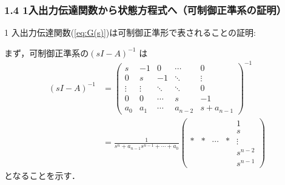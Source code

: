 \documentclass[10pt]{beamer}
\begin{document}
\begin{frame}[t]
\frametitle{1.4 1入出力伝達関数から状態方程式へ{\small （可制御正準系の証明）}}
1 入出力伝達関数(\ref{eq:G(s)})は可制御正準形で表されることの証明:

まず，可制御正準系の$(sI-A)^{-1}$ は
\begin{align}
 (sI-A)^{-1}
 &=
    \left(\begin{array}{ccccc}
     s      & -1     &  0     & \cdots &  0 \\
	 0      &  s     & -1     & \ddots &  \vdots \\
	 \vdots & \vdots & \ddots & \ddots &  0 \\
	 0      &  0     & \cdots & s      & -1 \\
	 a_0    &  a_1   & \cdots & a_{n-2}  &  s+a_{n-1}
	\end{array}\right)^{-1}
\nonumber\\
 &=
    \frac{1}{s^n + a_{n-1} s^{n-1}  + \cdots + a_0}
    \left(\begin{array}{ccccc}
        &    &        &    &  1 \\
	    &    &        &    &  s \\
	  * &  * & \cdots &  * &  \vdots \\
	    &    &        &    &  s^{n-2} \\
	    &    &        &    &  s^{n-1}
	\end{array}\right) 
\end{align}
となることを示す．
\end{frame}
\end{document}
